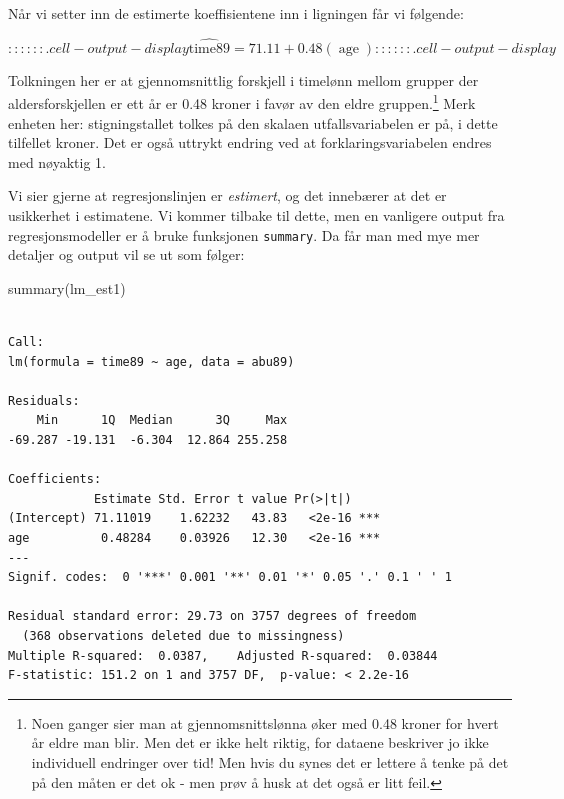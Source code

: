 \documentclass[
  letterpaper,
  DIV=11,
  numbers=noendperiod]{scrreprt}
\newenvironment{Shaded}{\begin{snugshade}}{\end{snugshade}}
\newcommand{\FunctionTok}[1]{\textcolor[rgb]{0.28,0.35,0.67}{#1}}
\newcommand{\NormalTok}[1]{\textcolor[rgb]{0.00,0.23,0.31}{#1}}
\theoremstyle{definition}
\theoremstyle{remark}
\begin{document}
Når vi setter inn de estimerte koeffisientene inn i ligningen får vi
følgende:

\begin{equation}
:::

::: {.cell-output-display}
\operatorname{\widehat{time89}} = 71.11 + 0.48(\operatorname{age})
:::

::: {.cell-output-display}
\end{equation}

Tolkningen her er at gjennomsnittlig forskjell i timelønn mellom grupper
der aldersforskjellen er ett år er 0.48 kroner i favør av den eldre
gruppen.\footnote{Noen ganger sier man at gjennomsnittslønna øker med
  0.48 kroner for hvert år eldre man blir. Men det er ikke helt riktig,
  for dataene beskriver jo ikke individuell endringer over tid! Men hvis
  du synes det er lettere å tenke på det på den måten er det ok - men
  prøv å husk at det også er litt feil.} Merk enheten her:
stigningstallet tolkes på den skalaen utfallsvariabelen er på, i dette
tilfellet kroner. Det er også uttrykt endring ved at
forklaringsvariabelen endres med nøyaktig 1.

Vi sier gjerne at regresjonslinjen er \emph{estimert}, og det innebærer
at det er usikkerhet i estimatene. Vi kommer tilbake til dette, men en
vanligere output fra regresjonsmodeller er å bruke funksjonen
\texttt{summary}. Da får man med mye mer detaljer og output vil se ut
som følger:

\begin{Shaded}
\begin{Highlighting}[]
\FunctionTok{summary}\NormalTok{(lm\_est1)}
\end{Highlighting}
\end{Shaded}

\begin{verbatim}

Call:
lm(formula = time89 ~ age, data = abu89)

Residuals:
    Min      1Q  Median      3Q     Max 
-69.287 -19.131  -6.304  12.864 255.258 

Coefficients:
            Estimate Std. Error t value Pr(>|t|)    
(Intercept) 71.11019    1.62232   43.83   <2e-16 ***
age          0.48284    0.03926   12.30   <2e-16 ***
---
Signif. codes:  0 '***' 0.001 '**' 0.01 '*' 0.05 '.' 0.1 ' ' 1

Residual standard error: 29.73 on 3757 degrees of freedom
  (368 observations deleted due to missingness)
Multiple R-squared:  0.0387,    Adjusted R-squared:  0.03844 
F-statistic: 151.2 on 1 and 3757 DF,  p-value: < 2.2e-16
\end{verbatim}
\end{document}

